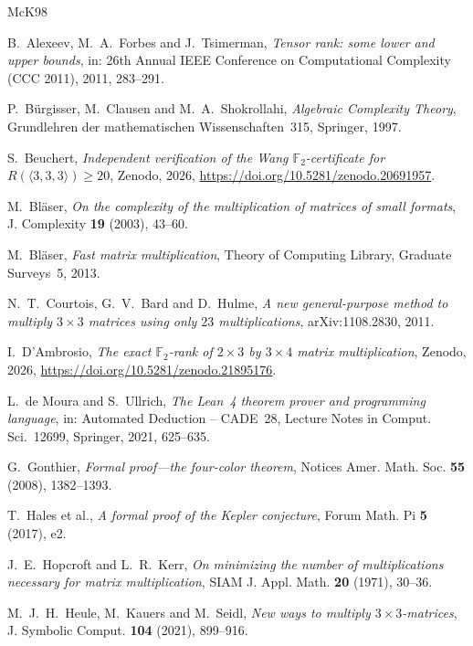 \documentclass[11pt]{amsart}
\theoremstyle{definition}
\theoremstyle{remark}
\numberwithin{equation}{section}
\newcommand{\F}{\mathbb{F}_2}
\begin{document}
\begin{thebibliography}{McK98}

B.~Alexeev, M.~A.~Forbes and J.~Tsimerman, \emph{Tensor rank: some lower and upper bounds}, in: 26th Annual IEEE Conference on Computational Complexity (CCC 2011), 2011, 283--291.

P.~B\"urgisser, M.~Clausen and M.~A.~Shokrollahi, \emph{Algebraic Complexity Theory}, Grundlehren der mathematischen Wissenschaften~315, Springer, 1997.

S.~Beuchert, \emph{Independent verification of the Wang $\F$-certificate for $R(\langle 3,3,3\rangle)\ge 20$}, Zenodo, 2026, \url{https://doi.org/10.5281/zenodo.20691957}.

M.~Bl\"aser, \emph{On the complexity of the multiplication of matrices of small formats}, J. Complexity \textbf{19} (2003), 43--60.

M.~Bl\"aser, \emph{Fast matrix multiplication}, Theory of Computing Library, Graduate Surveys~5, 2013.

N.~T.~Courtois, G.~V.~Bard and D.~Hulme, \emph{A new general-purpose method to multiply $3\times 3$ matrices using only $23$ multiplications}, arXiv:1108.2830, 2011.

I.~D'Ambrosio, \emph{The exact $\F$-rank of $2\times 3$ by $3\times 4$ matrix multiplication}, Zenodo, 2026, \url{https://doi.org/10.5281/zenodo.21895176}.

L.~de Moura and S.~Ullrich, \emph{The Lean~4 theorem prover and programming language}, in: Automated Deduction -- CADE~28, Lecture Notes in Comput. Sci.~12699, Springer, 2021, 625--635.

G.~Gonthier, \emph{Formal proof---the four-color theorem}, Notices Amer. Math. Soc. \textbf{55} (2008), 1382--1393.

T.~Hales et al., \emph{A formal proof of the Kepler conjecture}, Forum Math. Pi \textbf{5} (2017), e2.

J.~E.~Hopcroft and L.~R.~Kerr, \emph{On minimizing the number of multiplications necessary for matrix multiplication}, SIAM J. Appl. Math. \textbf{20} (1971), 30--36.

M.~J.~H.~Heule, M.~Kauers and M.~Seidl, \emph{New ways to multiply $3\times 3$-matrices}, J. Symbolic Comput. \textbf{104} (2021), 899--916.


\end{thebibliography}
\end{document}
